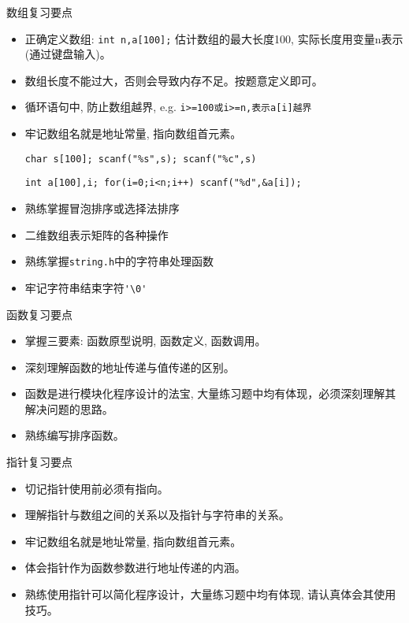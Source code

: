 \begin{frame}[fragile]{数组复习要点}
\begin{itemize}
	\item 正确定义数组: \lstinline|int n,a[100];| 估计数组的最大长度100, 实际长度用变量n表示(通过键盘输入)。
	\item 数组长度不能过大，否则会导致内存不足。按题意定义即可。
	\item 循环语句中, 防止数组越界, e.g. \lstinline|i>=100或i>=n,表示a[i]越界|
	\item 牢记数组名就是地址常量, 指向数组首元素。
	
	\lstinline|char s[100]; scanf("%s",s); scanf("%c",s)| 
	
	\lstinline|int a[100],i; for(i=0;i<n;i++) scanf("%d",&a[i]); | 
	\item 熟练掌握冒泡排序或选择法排序
	\item 二维数组表示矩阵的各种操作
	\item 熟练掌握\lstinline|string.h|中的字符串处理函数
	\item 牢记字符串结束字符\lstinline|'\0'|
\end{itemize}
\end{frame}

\begin{frame}{函数复习要点}
\begin{itemize}
	\item 掌握三要素: 函数原型说明, 函数定义, 函数调用。
	\item 深刻理解函数的地址传递与值传递的区别。
	\item 函数是进行模块化程序设计的法宝, 大量练习题中均有体现，必须深刻理解其解决问题的思路。
	\item 熟练编写排序函数。
\end{itemize}
\end{frame}

\begin{frame}[fragile]{指针复习要点}
\begin{itemize}
	\item 切记指针使用前必须有指向。
	\item 理解指针与数组之间的关系以及指针与字符串的关系。
	\item 牢记数组名就是地址常量, 指向数组首元素。
	\item 体会指针作为函数参数进行地址传递的内涵。
	\item 熟练使用指针可以简化程序设计，大量练习题中均有体现, 请认真体会其使用技巧。
\end{itemize}
\end{frame}

